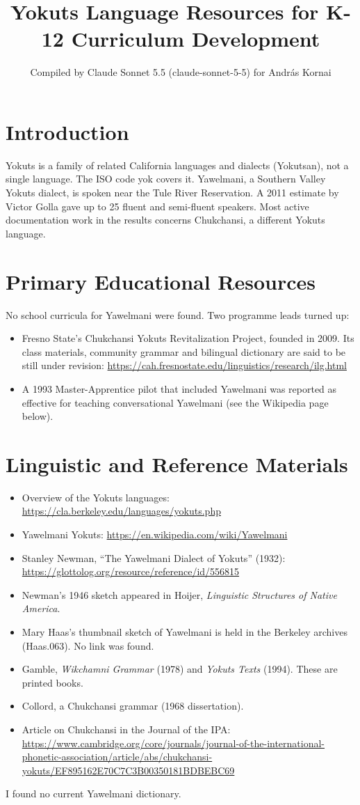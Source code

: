 \documentclass[12pt]{article}
\title{Yokuts Language Resources for K-12 Curriculum Development}
\author{Compiled by Claude Sonnet 5.5 (claude-sonnet-5-5) for Andr\'as Kornai}
\date{}
\begin{document}
\maketitle

\section{Introduction}
Yokuts is a family of related California languages and dialects (Yokutsan), not a single language. The ISO code yok covers it. Yawelmani, a Southern Valley Yokuts dialect, is spoken near the Tule River Reservation. A 2011 estimate by Victor Golla gave up to 25 fluent and semi-fluent speakers. Most active documentation work in the results concerns Chukchansi, a different Yokuts language.

\section{Primary Educational Resources}
No school curricula for Yawelmani were found. Two programme leads turned up:
\begin{itemize}
\item Fresno State's Chukchansi Yokuts Revitalization Project, founded in 2009. Its class materials, community grammar and bilingual dictionary are said to be still under revision: \url{https://cah.fresnostate.edu/linguistics/research/ilg.html}
\item A 1993 Master-Apprentice pilot that included Yawelmani was reported as effective for teaching conversational Yawelmani (see the Wikipedia page below).
\end{itemize}

\section{Linguistic and Reference Materials}
\begin{itemize}
\item Overview of the Yokuts languages: \url{https://cla.berkeley.edu/languages/yokuts.php}
\item Yawelmani Yokuts: \url{https://en.wikipedia.com/wiki/Yawelmani}
\item Stanley Newman, ``The Yawelmani Dialect of Yokuts'' (1932): \url{https://glottolog.org/resource/reference/id/556815}
\item Newman's 1946 sketch appeared in Hoijer, \emph{Linguistic Structures of Native America}.
\item Mary Haas's thumbnail sketch of Yawelmani is held in the Berkeley archives (Haas.063). No link was found.
\item Gamble, \emph{Wikchamni Grammar} (1978) and \emph{Yokuts Texts} (1994). These are printed books.
\item Collord, a Chukchansi grammar (1968 dissertation).
\item Article on Chukchansi in the Journal of the IPA: \url{https://www.cambridge.org/core/journals/journal-of-the-international-phonetic-association/article/abs/chukchansi-yokuts/EF895162E70C7C3B00350181BDBEBC69}
\end{itemize}
I found no current Yawelmani dictionary.
\end{document}
